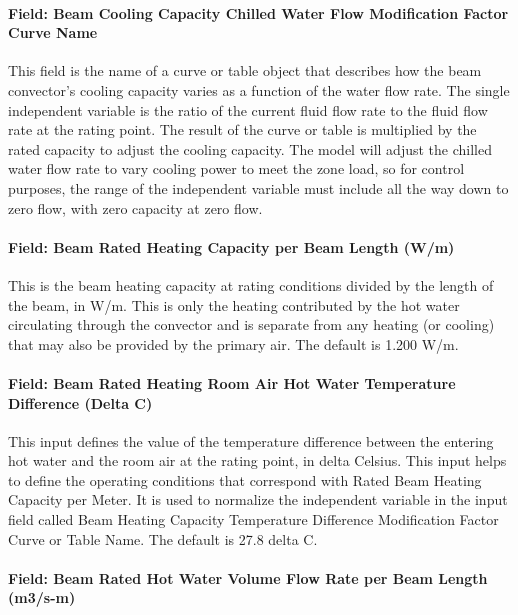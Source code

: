 \paragraph{Field: Beam Cooling Capacity Chilled Water Flow Modification Factor Curve Name}\label{field-beam-cooling-capacity-chilled-water-flow-modification-factor-curve-name}

This field is the name of a curve or table object that describes how the beam convector's cooling capacity varies as a function of the water flow rate. The single independent variable is the ratio of the current fluid flow rate to the fluid flow rate at the rating point. The result of the curve or table is multiplied by the rated capacity to adjust the cooling capacity. The model will adjust the chilled water flow rate to vary cooling power to meet the zone load, so for control purposes, the range of the independent variable must include all the way down to zero flow, with zero capacity at zero flow.

\paragraph{Field: Beam Rated Heating Capacity per Beam Length (W/m)}\label{field-beam-rated-heating-capacity-per-beam-length-wm}

This is the beam heating capacity at rating conditions divided by the length of the beam, in W/m. This is only the heating contributed by the hot water circulating through the convector and is separate from any heating (or cooling) that may also be provided by the primary air. The default is 1.200 W/m.

\paragraph{Field: Beam Rated Heating Room Air Hot Water Temperature Difference (Delta C)}\label{field-beam-rated-heating-room-air-hot-water-temperature-difference-delta-c}

This input defines the value of the temperature difference between the entering hot water and the room air at the rating point, in delta Celsius. This input helps to define the operating conditions that correspond with Rated Beam Heating Capacity per Meter. It is used to normalize the independent variable in the input field called Beam Heating Capacity Temperature Difference Modification Factor Curve or Table Name. The default is 27.8 delta C.

\paragraph{Field: Beam Rated Hot Water Volume Flow Rate per Beam Length (m3/s-m)}\label{field-beam-rated-hot-water-volume-flow-rate-per-beam-length-m3s-m}

